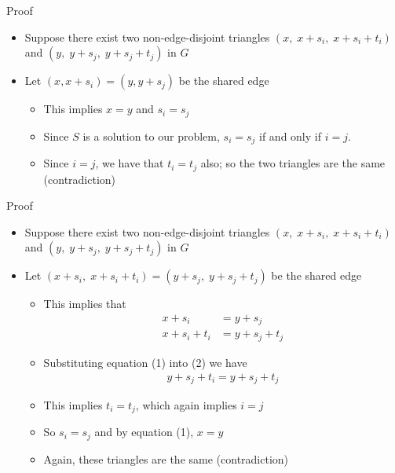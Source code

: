 \begin{frame}{Proof}
\begin{itemize}
	\item Suppose there exist two non-edge-disjoint triangles $(x,\; x+s_i,\; x+s_i+t_i)$ and $(y,\; y+s_j,\; y+s_j + t_j)$ in $G$
	\item<2-> Let $(x,x+s_i) = (y,y+s_j)$ be the shared edge
	\begin{itemize}
		\item<3-> This implies $x = y$ and $s_i = s_j$
		\item<4-> Since $S$ is a solution to our problem, $s_i = s_j$ if and only if $i = j$.
		\item<5-> Since $i = j$, we have that $t_i = t_j$ also; so the two triangles are the same (contradiction)
	\end{itemize}
\end{itemize}
\end{frame}

\begin{frame}{Proof}
\begin{itemize}
	\item Suppose there exist two non-edge-disjoint triangles $(x,\; x+s_i,\; x+s_i+t_i)$ and $(y,\; y+s_j,\; y+s_j + t_j)$ in $G$
	\item<2-> Let $(x+s_i,\; x+s_i+t_i) = (y + s_j,\; y+s_j+t_j)$ be the shared edge
	\begin{itemize}
		\item<3-> This implies that
		\begin{align}
			x+s_i &= y + s_j\\
			x+s_i+t_i &= y + s_j + t_j
		\end{align}
		\item<4-> Substituting equation (1) into (2) we have
		\begin{align*}
			y+s_j+t_i = y + s_j + t_j
		\end{align*}
		\item<5-> This implies $t_i = t_j$, which again implies $i = j$
		\item<6-> So $s_i = s_j$ and by equation (1), $x = y$
		\item<6-> Again, these triangles are the same (contradiction)
	\end{itemize}
\end{itemize}
\end{frame}

